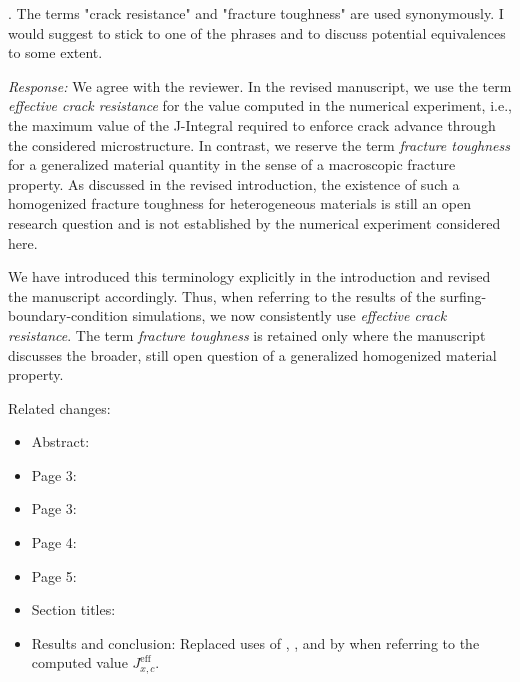 \documentclass[pdflatex,sn-mathphys-num]{sn-jnl}
\begin{document}
\bigskip

. The terms "crack resistance" and "fracture toughness" are used synonymously. I would suggest to stick to one of the phrases and to discuss potential equivalences to some extent.

\emph{Response:} We agree with the reviewer. In the revised manuscript, we use the term \textsl{effective crack resistance} for the value computed in the numerical experiment, i.e., the maximum value of the J-Integral required to enforce crack advance through the considered microstructure. In contrast, we reserve the term \textsl{fracture toughness} for a generalized material quantity in the sense of a macroscopic fracture property. As discussed in the revised introduction, the existence of such a homogenized fracture toughness for heterogeneous materials is still an open research question and is not established by the numerical experiment considered here.

We have introduced this terminology explicitly in the introduction and revised the manuscript accordingly. Thus, when referring to the results of the surfing-boundary-condition simulations, we now consistently use \textsl{effective crack resistance}. The term \textsl{fracture toughness} is retained only where the manuscript discusses the broader, still open question of a generalized homogenized material property.

Related changes:
\begin{itemize}
\item Abstract:  
\item Page 3: 
\item Page 3:  
\item Page 4:  
\item Page 5:  
\item Section titles:  
\item Results and conclusion: Replaced uses of , , and  by  when referring to the computed value $J_{x,c}^{\text{eff}}$.
\end{itemize}
\end{document}
